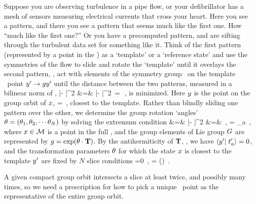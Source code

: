 \documentclass[aip,cha,graphicx]{revtex4-1}
\begin{document}
Suppose you are observing turbulence in a pipe flow, or your
defibrillator has a mesh of sensors measuring electrical currents that
cross your heart. Here you see a pattern, and there you see a pattern
that seems much like the first one. How ``much like the first one?'' Or
you have a precomputed pattern, and are sifting through the turbulent
data set for something like it. Think of the first pattern (represented
by a point {\slicep} in the \statesp) as a
`template' or a
`reference state' and use the symmetries of the flow to slide and rotate
the `template' until it overlays the second pattern, \ie, act with elements of
the symmetry group \Group\ on the template \statesp\ point ${{y'}} \to
{\ensuremath{g}}{{\ensuremath{y'}}}$ until the distance between the two patterns, measured
in a bilinear norm of ,
\bea
|\ssp - {\LieEl}{\slicep}|^2
    &=& |\sspRed - \slicep|^2
		\,=\,
   \braket{\sspRed - \slicep}{\sspRed - \slicep}
\,,
    \label{minDistance}
\eea
is minimized. Here $y$ is the point on the group orbit
of $x$,
\beq
\ssp=\LieEl \sspRed
\,,
closest to the template. Rather than blindly sliding one pattern over the
other, we determine the group rotation `angles' $\gSpace =
(\gSpace_1,\gSpace_2,\cdots\gSpace_N)$ by solving the extremum condition
 &=&
 |\ssp - \LieEl\slicep|^2
	\continue
  &=& 
    \,,\qquad
	   = \Lg_a \slicep
\,,
\label{PCsectQ}
\eea
where $\ssp \in \pS$ is a point in the full \statesp, and  the group
elements  of Lie group $G$ are represented  by
$g=\exp({\bf \theta} \cdot \mathbf{T})$.
By the antihermiticity of $\mathbf{T}$, ,  we have
$\braket{\slicep}{\sliceTan{a}}=0$, and the transformation parameters
${\bf \theta}$ for which the state $x$ is closest to the template
${y'}$ are fixed by $N$ slice conditions
\beq
{} =0
    \,,\qquad
\sspRed = \LieEl(\gSpace) \ssp
\,.

A given compact group orbit intersects a slice at least twice, and
possibly many times, so we need a prescription for how to
pick a unique \reducedsp\ point as the representative of the entire group
orbit.
\end{document}
